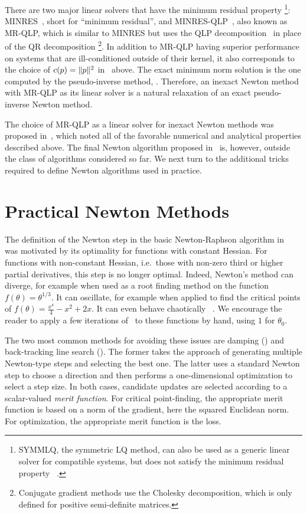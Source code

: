 \documentclass[../../thesis.tex]{subfiles}
\begin{document}
There are two major linear solvers
that have the minimum residual property%
\footnote{SYMMLQ, the symmetric LQ method,
can also be used as a generic linear solver
for compatible systems,
but does not satisfy the minimum residual property%
~\cite{paige1975}.}:
MINRES~\cite{paige1975},
short for \enquote{minimum residual},
and MINRES-QLP~\cite{choi2011},
also known as MR-QLP,
which is similar to MINRES but uses the
QLP decomposition~\cite{huckaby2005}
in place of the QR decomposition%
\footnote{Conjugate gradient methods use the
Cholesky decomposition,
which is only defined for positive semi-definite matrices.}.
In addition to MR-QLP having superior performance
on systems that are ill-conditioned outside of their kernel,
it also corresponds to the choice of $c(p) = \lVert p\rVert^2$
in~ above.
The exact minimum norm solution is the one computed by
the pseudo-inverse method,
.
Therefore, an inexact Newton method with MR-QLP
as its linear solver is a natural relaxation
of an exact pseudo-inverse Newton method.

The choice of MR-QLP as a linear solver
for inexact Newton methods
was proposed in~\cite{roosta2018},
which noted all of the favorable numerical
and analytical properties described above.
The final Newton algorithm proposed in~\cite{roosta2018}
is, however, outside the class of algorithms considered so far.
We next turn to the additional tricks required to
define Newton algorithms used in practice.

\section{Practical Newton Methods}

The definition of the Newton step in
the basic Newton-Raphson algorithm in~
was motivated by its optimality for functions with constant Hessian.
For functions with non-constant Hessian,
i.e.~those with non-zero third or higher partial derivatives,
this step is no longer optimal.
Indeed, Newton's method can diverge,
for example when used as a root finding method
on the function
$f(\theta) = \theta^{1/3}$.
It can oscillate, for example when applied to find the critical points of
$f(\theta) = \frac{x^4}{4} - x^2 + 2x$.
It can even behave chaotically%
~\cite{griewank1983}.
We encourage the reader to apply a few iterations
of~ to these functions by hand,
using $1$ for $\theta_0$.

The two most common methods for avoiding
these issues are damping ()
and back-tracking line search ().
The former takes the approach of generating
multiple Newton-type steps and selecting
the best one.
The latter uses a standard Newton step
to choose a direction and then performs
a one-dimensional optimization
to select a step size.
In both cases, candidate updates are selected
according to a scalar-valued \emph{merit function}.
For critical point-finding,
the appropriate merit function is based on a norm of the gradient,
here the squared Euclidean norm.
For optimization, the appropriate merit function
is the loss.
\end{document}
